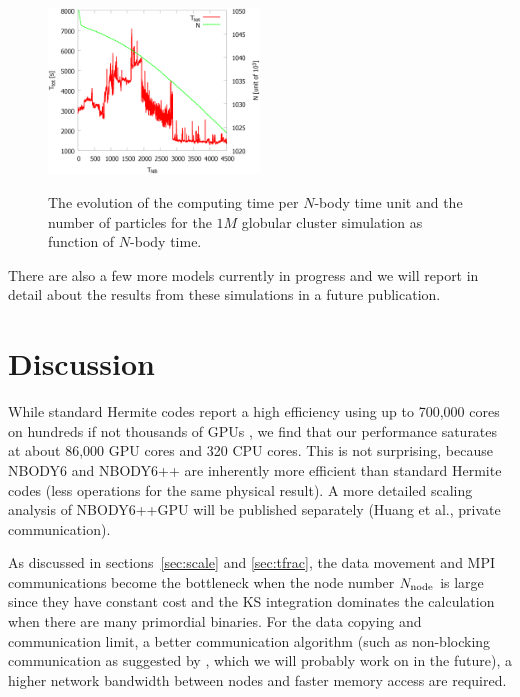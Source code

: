 \documentclass[usenatbib,aas_macros]{mn2e}
\def\nbody{NBODY6 }
\def\nbodypp{NBODY6++ }
\def\nbodyppgpu{NBODY6++GPU }
\def\nb{$N$-body }
\begin{document}
\begin{figure}
  \centering
  \includegraphics[width=0.5\textwidth,height=!]{timeevolve.eps}\\
  \caption{The evolution of the computing time per \nb time unit and the number of particles for the $1M$ globular cluster simulation as function of \nb time.}
  \label{fig:tevolve}
\end{figure}

There are also a few more models currently in progress and we will report in detail about the results from these simulations in a future publication.


\section{Discussion}
\label{sec:discussion}

While standard Hermite codes report a high efficiency using up to 700,000 cores on hundreds if not thousands of GPUs \citep{Berczik2013a,Berczik2013b}, we find that our performance saturates at about 86,000 GPU cores and 320 CPU cores. 
This is not surprising, because \nbody and \nbodypp are inherently more efficient than standard Hermite codes (less operations for the same physical result). 
A more detailed scaling analysis of \nbodyppgpu will be published separately (Huang et al., private communication).

As discussed in sections~\ref{sec:scale} and \ref{sec:tfrac}, the data movement and MPI communications become the bottleneck when the node number $N_{\rm node}$ is large since they have constant cost and the KS integration dominates the calculation when there are many primordial binaries.
For the data copying and communication limit, a better communication algorithm (such as non-blocking communication as suggested by \cite{Dorband2003}, which we will probably work on in the future), a higher network bandwidth between nodes and faster memory access are required. 
\end{document}
